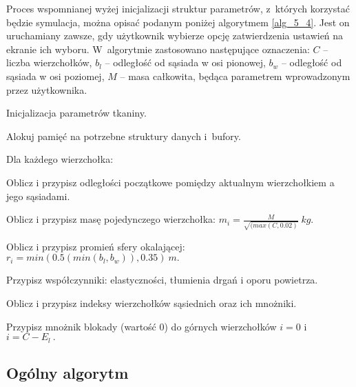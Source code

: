 			Proces wspomnianej wyżej inicjalizacji struktur parametrów, z~których korzystać będzie symulacja, można opisać podanym poniżej algorytmem \ref{alg_5_4}. Jest on uruchamiany zawsze, gdy użytkownik wybierze opcję zatwierdzenia ustawień na ekranie ich wyboru. W~algorytmie zastosowano następujące oznaczenia: \(C\) -- liczba wierzchołków, \(b_{l}\) -- odległość od sąsiada w osi pionowej, \(b_{w}\) -- odległość od sąsiada w osi poziomej, \(M\) -- masa całkowita, będąca parametrem wprowadzonym przez użytkownika.
			
			\begin{algorithm}
				\label{alg_5_4}
				\caption{Inicjalizacja parametrów tkaniny.}	
				
				Alokuj pamięć na potrzebne struktury danych i~bufory.
				
				Dla każdego wierzchołka:
				
				\Indp
				
				Oblicz i przypisz odległości początkowe pomiędzy aktualnym wierzchołkiem a jego sąsiadami.
				
				
				
				
				
				
				
				Oblicz i przypisz masę pojedynczego wierzchołka: \( m_{i} = \frac{M}{\sqrt{(max(C, 0.02)}} \  kg. \)
				
				Oblicz i przypisz promień sfery okalającej: \( r_{i} = min( 0.5(min(b_{l}, b_{w})), 0.35 ) \ m. \)
				
				Przypisz współczynniki: elastyczności, tłumienia drgań i oporu powietrza.
				
				Oblicz i przypisz indeksy wierzchołków sąsiednich oraz ich mnożniki.
				
				\Indm
				
				Przypisz mnożnik blokady (wartość \(0\)) do górnych wierzchołków \(i = 0\) i \(i = C - E_{l} \ .\)
				
			\end{algorithm}
		\newpage
		\subsection{Ogólny algorytm}
		\label{t:symulacja:dzialanie:algorytm}
		
